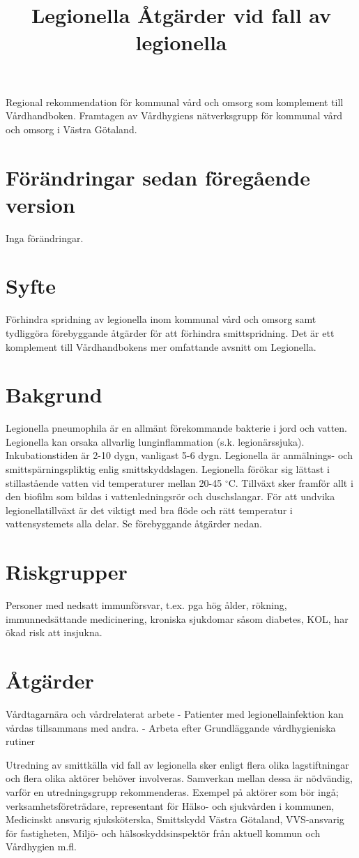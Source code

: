\title{
Legionella
}
Regional rekommendation för kommunal vård och omsorg som komplement till Vårdhandboken. Framtagen av Vårdhygiens nätverksgrupp för kommunal vård och omsorg i Västra Götaland.
\section*{Förändringar sedan föregående version}
Inga förändringar.
\section*{Syfte}
Förhindra spridning av legionella inom kommunal vård och omsorg samt tydliggöra förebyggande åtgärder för att förhindra smittspridning. Det är ett komplement till Vårdhandbokens mer omfattande avsnitt om Legionella.
\section*{Bakgrund}
Legionella pneumophila är en allmänt förekommande bakterie i jord och vatten.
Legionella kan orsaka allvarlig lunginflammation (s.k. legionärssjuka).
Inkubationstiden är 2-10 dygn, vanligast 5-6 dygn. Legionella är anmälnings- och smittspärningspliktig enlig smittskyddslagen.
Legionella förökar sig lättast i stillastående vatten vid temperaturer mellan 20-45 \({ }^{\circ} \mathrm{C}\). Tillväxt sker framför allt i den biofilm som bildas i vattenledningsrör och duschslangar. För att undvika legionellatillväxt är det viktigt med bra flöde och rätt temperatur i vattensystemets alla delar. Se förebyggande åtgärder nedan.
\section*{Riskgrupper}
Personer med nedsatt immunförsvar, t.ex. pga hög ålder, rökning, immunnedsättande medicinering, kroniska sjukdomar såsom diabetes, KOL, har ökad risk att insjukna.
\section*{Åtgärder}
Vårdtagarnära och vårdrelaterat arbete
- Patienter med legionellainfektion kan vårdas tillsammans med andra.
- Arbeta efter Grundläggande vårdhygieniska rutiner

\title{
Åtgärder vid fall av legionella
}
Utredning av smittkälla vid fall av legionella sker enligt flera olika lagstiftningar och flera olika aktörer behöver involveras. Samverkan mellan dessa är nödvändig, varför en utredningsgrupp rekommenderas. Exempel på aktörer som bör ingå; verksamhetsföreträdare, representant för Hälso- och sjukvården i kommunen, Medicinskt ansvarig sjuksköterska, Smittskydd Västra Götaland, VVS-ansvarig för fastigheten, Miljö- och hälsoskyddsinspektör från aktuell kommun och Vårdhygien m.fl.
